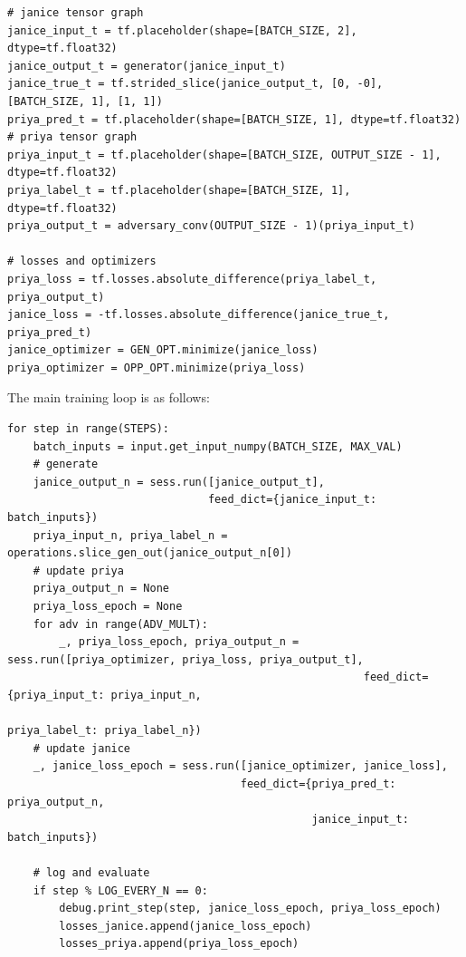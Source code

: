 \documentclass[12pt, titlepage]{report}
\theoremstyle{definition}
\begin{document}
\begin{verbatim}
# janice tensor graph
janice_input_t = tf.placeholder(shape=[BATCH_SIZE, 2], dtype=tf.float32)
janice_output_t = generator(janice_input_t)
janice_true_t = tf.strided_slice(janice_output_t, [0, -0], [BATCH_SIZE, 1], [1, 1])
priya_pred_t = tf.placeholder(shape=[BATCH_SIZE, 1], dtype=tf.float32)
# priya tensor graph
priya_input_t = tf.placeholder(shape=[BATCH_SIZE, OUTPUT_SIZE - 1], dtype=tf.float32)
priya_label_t = tf.placeholder(shape=[BATCH_SIZE, 1], dtype=tf.float32)
priya_output_t = adversary_conv(OUTPUT_SIZE - 1)(priya_input_t)

# losses and optimizers
priya_loss = tf.losses.absolute_difference(priya_label_t, priya_output_t)
janice_loss = -tf.losses.absolute_difference(janice_true_t, priya_pred_t)
janice_optimizer = GEN_OPT.minimize(janice_loss)
priya_optimizer = OPP_OPT.minimize(priya_loss)
\end{verbatim}

The main training loop is as follows:

\begin{verbatim}
for step in range(STEPS):
    batch_inputs = input.get_input_numpy(BATCH_SIZE, MAX_VAL)
    # generate
    janice_output_n = sess.run([janice_output_t],
                               feed_dict={janice_input_t: batch_inputs})
    priya_input_n, priya_label_n = operations.slice_gen_out(janice_output_n[0])
    # update priya
    priya_output_n = None
    priya_loss_epoch = None
    for adv in range(ADV_MULT):
        _, priya_loss_epoch, priya_output_n = sess.run([priya_optimizer, priya_loss, priya_output_t],
                                                       feed_dict={priya_input_t: priya_input_n,
                                                                  priya_label_t: priya_label_n})
    # update janice
    _, janice_loss_epoch = sess.run([janice_optimizer, janice_loss],
                                    feed_dict={priya_pred_t: priya_output_n,
                                               janice_input_t: batch_inputs})

    # log and evaluate
    if step % LOG_EVERY_N == 0:
        debug.print_step(step, janice_loss_epoch, priya_loss_epoch)
        losses_janice.append(janice_loss_epoch)
        losses_priya.append(priya_loss_epoch)
\end{verbatim}



\end{document}
